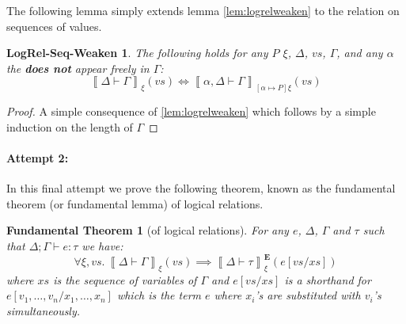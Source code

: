\documentclass{article}
\newcommand{\pred}{P}
\newcommand{\semtyp}[3]{\left\llbracket #2 \vdash #3 \right\rrbracket_{#1}}
\newcommand{\semErel}[1]{#1^{\textbf{E}}}
\newcommand{\semenv}{\xi}
\newcommand{\Tctx}{\Gamma}
\newcommand{\CtxTps}{\Delta}
\newcommand{\expr}{e}
\newcommand{\val}{v}
\newcommand{\var}{x}
\newcommand{\typ}{\tau}
\newcommand{\tvar}{\alpha}
\newcommand{\typed}[4]{#1; #2 \vdash #3 : #4}
\begin{document}
The following lemma simply extends lemma \ref{lem:logrelweaken} to the relation on sequences of values.
\newtheorem*{logrelseqweaken}{LogRel-Seq-Weaken}
\begin{logrelseqweaken}
  \makeatletter{}\makeatother
  \label{lem:logrelseqweaken}
  The following holds for any $\pred$ $\semenv$, $\CtxTps$, $\mathit{vs}$, $\Tctx$, and any $\tvar$ the \textbf{does not} appear freely in $\Tctx$:
  \[ \semtyp{\semenv}{\CtxTps}{\Tctx}(\mathit{vs}) \iff \semtyp{[\tvar \mapsto \pred]\semenv}{\tvar, \CtxTps}{\Tctx}(\mathit{vs}) \]
\end{logrelseqweaken}
\begin{proof}
A simple consequence of \ref{lem:logrelweaken} which follows by a simple induction on the length of $\Tctx$
\end{proof}

\paragraph{Attempt 2:} In this final attempt we prove the following theorem, known as the fundamental theorem (or fundamental lemma) of logical relations.

\newtheorem*{fundamentaltheorem}{Fundamental Theorem}

\begin{fundamentaltheorem}[of logical relations]
  \makeatletter{}\makeatother
  \label{thm:fundamental}
For any $e$, $\CtxTps$, $\Tctx$ and $\typ$ such that $\typed{\CtxTps}{\Tctx}{\expr}{\typ}$ we have:
\[
\forall \semenv, \mathit{vs}. ~\semtyp{\semenv}{\CtxTps}{\Tctx}(\mathit{vs}) \implies
\semErel{\semtyp{\semenv}{\CtxTps}{\typ}}(\expr[\mathit{vs}/\mathit{xs}])
\]
where $\mathit{xs}$ is the sequence of variables of $\Tctx$ and $\expr[\mathit{vs}/\mathit{xs}]$ is a shorthand for $\expr[\val_1, \dots, \val_n/\var_1, \dots, \var_n]$ which is the term $\expr$ where $\var_i$'s are substituted with $\val_i$'s simultaneously.
\end{fundamentaltheorem}
\end{document}
